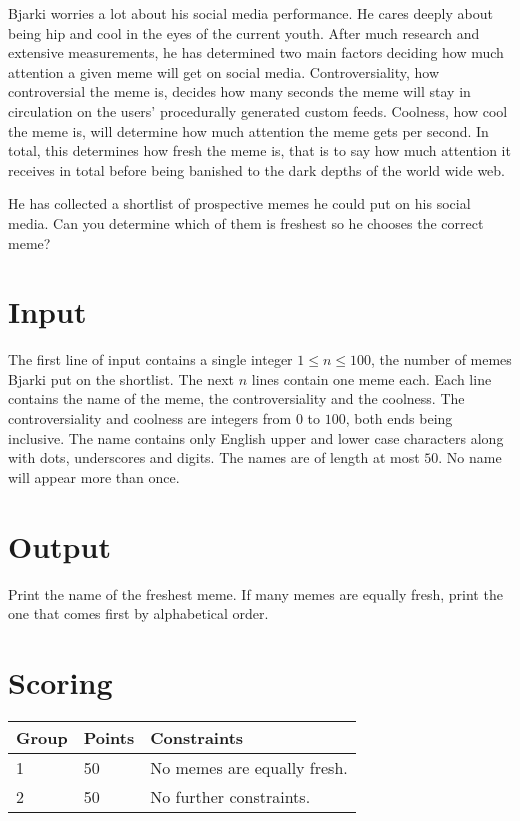
Bjarki worries a lot about his social media performance. He cares deeply about being hip and cool in the eyes of the current youth.
After much research and extensive measurements, he has determined two main factors deciding how much attention a given meme will get
on social media. Controversiality, how controversial the meme is, decides how many seconds the meme will stay in circulation on the users'
procedurally generated custom feeds. Coolness, how cool the meme is, will determine how much attention the meme gets per second. In total,
this determines how fresh the meme is, that is to say how much attention it receives in total before being banished to the dark depths
of the world wide web.

He has collected a shortlist of prospective memes he could put on his social media. Can you determine which of them is freshest so he
chooses the correct meme?

\section*{Input}
The first line of input contains a single integer $1 \leq n \leq 100$, the number of memes Bjarki put on the shortlist.
The next $n$ lines contain one meme each. Each line contains the name of the meme, the controversiality and the coolness. The
controversiality and coolness are integers from $0$ to $100$, both ends being inclusive. The name contains only English upper and lower case characters along with
dots, underscores and digits. The names are of length at most $50$. No name will appear more than once.

\section*{Output}
Print the name of the freshest meme. If many memes are equally fresh, print the one that comes first by alphabetical order.

\section*{Scoring}
\begin{tabular}{|l|l|l|}
\hline
Group & Points & Constraints \\ \hline
1     & 50   & No memes are equally fresh. \\ \hline
2     & 50   & No further constraints. \\ \hline
\end{tabular}
